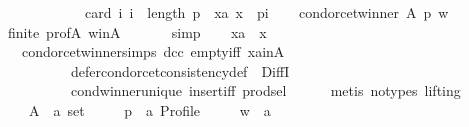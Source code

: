 \begin{isabellebody}
\ \ \ \ \ \ \ \ \ \ \ \ card\ {\isacharbraceleft}{\kern0pt}i{\isachardot}{\kern0pt}\ i\ {\isacharless}{\kern0pt}\ length\ p\ {\isasymand}\ {\isacharparenleft}{\kern0pt}xa{\isacharcomma}{\kern0pt}\ x{\isacharparenright}{\kern0pt}\ {\isasymin}\ {\isacharparenleft}{\kern0pt}p{\isacharbang}{\kern0pt}i{\isacharparenright}{\kern0pt}{\isacharbraceright}{\kern0pt}{\isachardoublequoteclose}\isanewline
\ \ \isamarkupfalse%
\ {\isachardoublequoteopen}condorcet{\isacharunderscore}{\kern0pt}winner\ A\ p\ w{\isachardoublequoteclose}\isanewline
\ \ \ \ \isamarkupfalse%
\ finite\ prof{\isacharunderscore}{\kern0pt}A\ w{\isacharunderscore}{\kern0pt}in{\isacharunderscore}{\kern0pt}A\ {\isachardoublequoteopen}{}{\isachardoublequoteclose}\isanewline
\ \ \ \ \isamarkupfalse%
\ simp\isanewline
\ \ \isamarkupfalse%
\ {\isachardoublequoteopen}xa\ {\isacharequal}{\kern0pt}\ x{\isachardoublequoteclose}\isanewline
\ \ \ \ \isamarkupfalse%
\ {\isachardoublequoteopen}{}{\isachardoublequoteclose}\ {\isachardoublequoteopen}{}{\isachardoublequoteclose}\ condorcet{\isacharunderscore}{\kern0pt}winner{\isachardot}{\kern0pt}simps\ dcc\ empty{\isacharunderscore}{\kern0pt}iff\ xa{\isacharunderscore}{\kern0pt}in{\isacharunderscore}{\kern0pt}A\isanewline
\ \ \ \ \ \ \ \ \ \ defer{\isacharunderscore}{\kern0pt}condorcet{\isacharunderscore}{\kern0pt}consistency{\isacharunderscore}{\kern0pt}def\ {\isachardoublequoteopen}{}{\isachardoublequoteclose}\ DiffI\isanewline
\ \ \ \ \ \ \ \ \ \ cond{\isacharunderscore}{\kern0pt}winner{\isacharunderscore}{\kern0pt}unique{}\ insert{\isacharunderscore}{\kern0pt}iff\ prod{\isachardot}{\kern0pt}sel{\isacharparenleft}{\kern0pt}{}{\isacharparenright}{\kern0pt}\isanewline
\ \ \ \ \isamarkupfalse%
\ {\isacharparenleft}{\kern0pt}metis\ {\isacharparenleft}{\kern0pt}no{\isacharunderscore}{\kern0pt}types{\isacharcomma}{\kern0pt}\ lifting{\isacharparenright}{\kern0pt}{\isacharparenright}{\kern0pt}\isanewline
{}\isamarkupfalse%
\isanewline
\ \ \isamarkupfalse%
\isanewline
\ \ \ \ A\ {\isacharcolon}{\kern0pt}{\isacharcolon}{\kern0pt}\ {\isachardoublequoteopen}{\isacharprime}{\kern0pt}a\ set{\isachardoublequoteclose}\ \isanewline
\ \ \ \ p\ {\isacharcolon}{\kern0pt}{\isacharcolon}{\kern0pt}\ {\isachardoublequoteopen}{\isacharprime}{\kern0pt}a\ Profile{\isachardoublequoteclose}\ \isanewline
\ \ \ \ w\ {\isacharcolon}{\kern0pt}{\isacharcolon}{\kern0pt}\ {\isachardoublequoteopen}{\isacharprime}{\kern0pt}a{\isachardoublequoteclose}\ \isanewline

\end{isabellebody}
